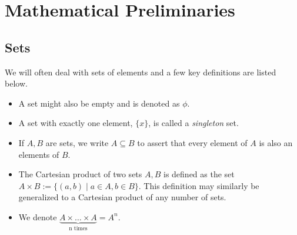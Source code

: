 \documentclass[10pt]{article}
\begin{document}
\section{Mathematical Preliminaries}
\subsection{Sets}
We will often deal with sets of elements and a few key definitions are listed below. 
\begin{itemize}
    \item A set might also be empty and is denoted as $\phi$.
    \item A set with exactly one element, $\{x\}$, is called a \textit{singleton} set.
    \item If $A, B$ are sets, we write $A \subseteq B$ to assert that every element of $A$ is also an elements of $B$.
    \item The Cartesian product of two sets $A, B$ is defined as the set $A \times B := \{(a,b)\mid a\in A, b\in B\}$. This definition may similarly be generalized to a Cartesian product of any number of sets.
    \item We denote $\underbrace{A\times \ldots \times A}_\text{n times} = A^n$.
\end{itemize}
\end{document}
